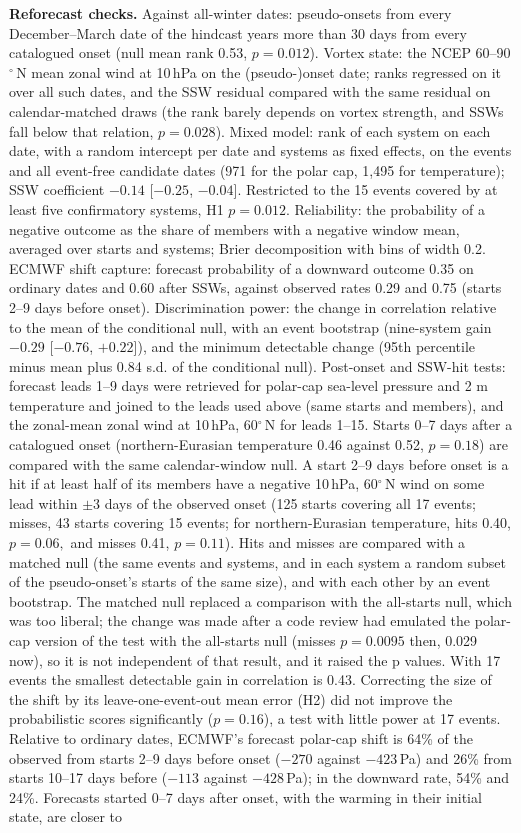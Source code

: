 \documentclass[11pt]{article}
\begin{document}
\textbf{Reforecast checks.} Against all-winter dates: pseudo-onsets from every December–March date of the hindcast years more than 30 days from every catalogued onset (null mean rank 0.53, $p = 0.012$). Vortex state: the NCEP 60–90$^\circ$\,N mean zonal wind at 10\,hPa on the (pseudo-)onset date; ranks regressed on it over all such dates, and the SSW residual compared with the same residual on calendar-matched draws (the rank barely depends on vortex strength, and SSWs fall below that relation, $p = 0.028$). Mixed model: rank of each system on each date, with a random intercept per date and systems as fixed effects, on the events and all event-free candidate dates (971 for the polar cap, 1,495 for temperature); SSW coefficient $-0.14$ [$-0.25$, $-0.04$]. Restricted to the 15 events covered by at least five confirmatory systems, H1 $p = 0.012.$ Reliability: the probability of a negative outcome as the share of members with a negative window mean, averaged over starts and systems; Brier decomposition with bins of width 0.2. ECMWF shift capture: forecast probability of a downward outcome 0.35 on ordinary dates and 0.60 after SSWs, against observed rates 0.29 and 0.75 (starts 2–9 days before onset). Discrimination power: the change in correlation relative to the mean of the conditional null, with an event bootstrap (nine-system gain $-0.29$ [$-0.76$, $+0.22$]), and the minimum detectable change (95th percentile minus mean plus 0.84 s.d. of the conditional null). Post-onset and SSW-hit tests: forecast leads 1–9 days were retrieved for polar-cap sea-level pressure and 2 m temperature and joined to the leads used above (same starts and members), and the zonal-mean zonal wind at 10\,hPa, 60$^\circ$\,N for leads 1–15. Starts 0–7 days after a catalogued onset (northern-Eurasian temperature 0.46 against 0.52, $p = 0.18$) are compared with the same calendar-window null. A start 2–9 days before onset is a hit if at least half of its members have a negative 10\,hPa, 60$^\circ$\,N wind on some lead within $\pm3$ days of the observed onset (125 starts covering all 17 events; misses, 43 starts covering 15 events; for northern-Eurasian temperature, hits 0.40, $p = 0.06,$ and misses 0.41, $p = 0.11$). Hits and misses are compared with a matched null (the same events and systems, and in each system a random subset of the pseudo-onset's starts of the same size), and with each other by an event bootstrap. The matched null replaced a comparison with the all-starts null, which was too liberal; the change was made after a code review had emulated the polar-cap version of the test with the all-starts null (misses $p = 0.0095$ then, 0.029 now), so it is not independent of that result, and it raised the p values. With 17 events the smallest detectable gain in correlation is 0.43. Correcting the size of the shift by its leave-one-event-out mean error (H2) did not improve the probabilistic scores significantly ($p = 0.16$), a test with little power at 17 events. Relative to ordinary dates, ECMWF's forecast polar-cap shift is 64\% of the observed from starts 2–9 days before onset ($-270$ against $-423$\,Pa) and 26\% from starts 10–17 days before ($-113$ against $-428$\,Pa); in the downward rate, 54\% and 24\%. Forecasts started 0–7 days after onset, with the warming in their initial state, are closer to 
\end{document}
